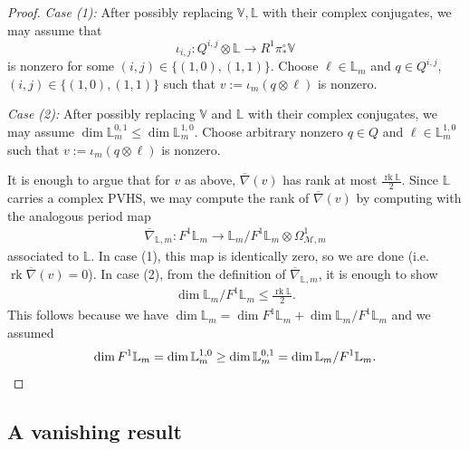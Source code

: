 \documentclass[12 pt]{amsart}
\theoremstyle{plain}
\theoremstyle{definition}
\theoremstyle{remark}
\numberwithin{equation}{section}
\DeclareMathOperator\rk{rk}
\begin{document}
\begin{proof}
\emph{Case (1):} After possibly replacing ${\mathbb{V}}, \mathbb{L}$ with their complex conjugates, we may assume that  $$\iota_{i,j}: Q^{i,j}\otimes\mathbb{L}\to R^1\pi_*^\circ \mathbb{V}$$ is nonzero for some $(i,j)\in \{(1,0), (1,1)\}$. Choose $\ell\in \mathbb{L}_m$ and $q\in Q^{i,j}$, $(i,j)\in\{(1,0), (1,1)\}$ such that $v:=\iota_m(q\otimes\ell)$ is nonzero.

\emph{Case (2):} After possibly replacing $\mathbb{V}$ and $\mathbb{L}$ with
their complex conjugates, we may assume $\dim\mathbb{L}_m^{0,1}\leq \dim \mathbb{L}_m^{1,0}$. 
Choose arbitrary nonzero $q\in Q$ and $\ell\in \mathbb{L}_m^{1,0}$ such that $v:=\iota_m(q\otimes\ell)$ is nonzero.

It is enough to argue that for $v$ as above, $\overline{\nabla}(v)$ has rank at
most $\frac{\rk\mathbb{L}}{2}$. Since $\mathbb{L}$ carries a complex PVHS, we
may compute the rank of $\overline{\nabla}(v)$ by computing with the analogous
period map 
\begin{align*}
\overline{\nabla}_{\mathbb L,m}: F^1\mathbb{L}_m\to \mathbb{L}_m/F^1\mathbb{L}_m\otimes \Omega^1_{\mathscr{M},m}
\end{align*}
associated to $\mathbb{L}$. In case (1), this map is identically
zero, so we are done (i.e.~$\rk \overline{\nabla}(v)=0$). In case (2), 
from the definition of $\overline{\nabla}_{\mathbb L,m}$,
it
is enough to show
\begin{align*}
	\dim \mathbb{L}_m/F^1\mathbb{L}_m\leq \frac{\rk \mathbb L}{2}.
\end{align*}
This follows because we have 
$\dim \mathbb{L}_m=\dim F^1 \mathbb{L}_m+ \dim \mathbb{L}_m/F^1 \mathbb L_m$ and
we assumed
\begin{equation*}
	\dim F^1 \mathbb L_m = \dim \mathbb L^{1,0}_m \geq \dim \mathbb
	L^{0,1}_m = \dim \mathbb L_m/F^1 \mathbb L_m.\qedhere
\end{equation*}
\end{proof}

\subsection{A vanishing result}
\label{subsection:no-sections}
\end{document}
